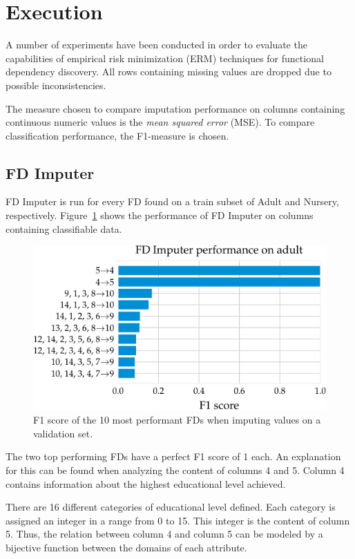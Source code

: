 \newpage
\section{Execution}
A number of experiments have been conducted in order to evaluate the capabilities of empirical risk minimization (ERM) techniques for functional dependency discovery.
All rows containing missing values are dropped due to possible inconsistencies.

The measure chosen to compare imputation performance on columns containing continuous numeric values is the \emph{mean squared error} (MSE).
To compare classification performance, the F1-measure is chosen.

\subsection{FD Imputer}
FD Imputer is run for every FD found on a train subset of Adult and Nursery, respectively.
Figure~\ref{fig:f1_fd_adult} shows the performance of FD Imputer on columns containing classifiable data.
\begin{figure}[h]
     \centering
     \includegraphics[width=.8\textwidth]{../figures/adult/f1_fd_imputer_adult.pdf}
     \caption{F1 score of the 10 most performant FDs when imputing values on a validation set.}
     \label{fig:f1_fd_adult}
 \end{figure}
The two top performing FDs have a perfect F1 score of 1 each.
An explanation for this can be found when analyzing the content of columns 4 and 5.
Column 4 contains information about the highest educational level achieved.

There are 16 different categories of educational level defined.
Each category is assigned an integer in a range from 0 to 15.
This integer is the content of column 5.
Thus, the relation between column 4 and column 5 can be modeled by a bijective function between the domains of each attribute.

